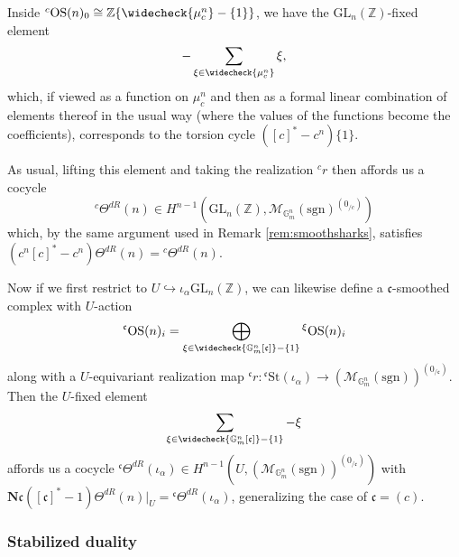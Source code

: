 \documentclass[10pt]{amsart}
\theoremstyle{definition}
\newcommand{\Z}{\mathbb{Z}}
\renewcommand{\c}{\mathfrak{c}}
\newcommand{\sgn}{\mathrm{sgn}}
\newcommand{\St}{\mathrm{St}}
\newcommand{\OS}{\mathrm{OS}}
\newcommand{\G}{\mathbb{G}}
\newcommand{\GL}{\mathrm{GL}}
\numberwithin{equation}{section}
\begin{document}
    Inside ${}^c\OS(n)_0\cong \Z\{\widecheck{\mu_{c}^n}-\{1\}\}$, we have the $\GL_n(\Z)$-fixed element 
    \[
    -\sum_{\xi \in \widecheck{\mu_{c}^n}} \xi,\]
    which, if viewed as a function on $\mu_c^n$ and then as a formal linear combination of elements thereof in the usual way (where the values of the functions become the coefficients), corresponds to the torsion cycle $([c]^*-c^n)\{1\}$.
    
    As usual, lifting this element and taking the realization ${}^cr$ then affords us a cocycle 
    \[
        {}^c\Theta^{dR}(n)\in H^{n-1}(\GL_n(\Z),\mathcal{M}_{\G_m^n}(\sgn)^{(0_{/c})})
    \]
    which, by the same argument used in Remark \ref{rem:smoothsharks}, satisfies $(c^n[c]^*-c^n)\Theta^{dR}(n) = {}^c\Theta^{dR}(n)$.
    
    Now if we first restrict to $U\hookrightarrow{\iota_\alpha} \GL_n(\Z)$, we can likewise define a $\c$-smoothed complex with $U$-action
    \[
    {}^\c\OS(n)_i=\bigoplus_{\xi\in \widecheck{\G_m^n[\c]}-\{1\}} {}^\xi\OS(n)_i
    \]
    along with a $U$-equivariant realization map ${}^\c r: {}^\c\St(\iota_\alpha) \to (\mathcal{M}_{\G_m^n}(\sgn))^{(0_{/\c})}$. Then the $U$-fixed element 
    \[
    \sum_{\xi \in \widecheck{\G_m^n[\c]}-\{1\}} - \xi
    \]
    affords us a cocycle ${}^\c\Theta^{dR}(\iota_\alpha)\in H^{n-1}(U, (\mathcal{M}_{\G_m^n}(\sgn))^{(0_{/\c})})$ with $\mathbf{N}\c([\c]^*-1)\Theta^{dR}(n)|_U = {}^\c\Theta^{dR}(\iota_\alpha)$, generalizing the case of $\c=(c)$.

    \subsubsection{Stabilized duality}
\end{document}
